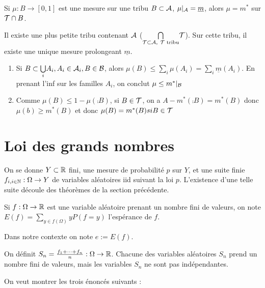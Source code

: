 \documentclass[10pt,a4paper,notitlepage ]{report}
\begin{document}
\begin{theorem}
	Si $\mu : B \rightarrow [0,1]$ est une mesure sur une tribu $B \subset \mathcal A$, $\mu|_\mathcal A = \underline m$, alors $\mu=m^*$ sur $\mathcal T \cap B$.
\end{theorem}

\begin{rem}
	Il existe une plus petite tribu contenant $\mathcal A$ ($\underset{\mathcal T \subset \mathcal A,\ \mathcal T \text{ tribu}}{\bigcap} \mathcal T$). Sur cette tribu, il existe une unique mesure prolongeant $\underline m$.
\end{rem}

\begin{demo}
	\begin{enumerate}
		\item Si $B \subset \underset i \bigcup A_i, A_i \in \mathcal A_i, B \in \mathcal B$, alors $\mu(B) \le \underset i \sum \mu(A_i) = \underset i \sum \underline m(A_i)$. En prenant l'inf sur les familles $A_i$, on conclut $\mu \le m^*|_\mathcal B$
		\item Comme $\mu(B) \le 1- \mu(\comp B)$, si $B \in \mathcal T$, on a $A-m^*(\comp B) = m^*(B)$ donc $\mu(b) \ge m^*(B)$ et donc $\mu(B) = m^*(B) si B\in \mathcal T$
	
	\end{enumerate}
\end{demo}

\section{Loi des grands nombres}

On se donne $Y \subset \mathbb R$ fini, une mesure de probabilité $p$ sur $Y$, et une suite finie $f_{i,i\in\mathbb N} : \Omega \rightarrow Y$ de variables aléatoires iid suivant la loi $p$. L'existence d'une telle suite découle des théorèmes de la section précédente.

\begin{definition}
	Si $f : \Omega \rightarrow \mathbb R$ est une variable aléatoire prenant un nombre fini de valeurs, on note $E(f) = \underset{y \in f(\Omega)} \sum yP(f=y)$ l'espérance de $f$.
\end{definition}

Dans notre contexte on note $e := E(f)$.

On définit $S_n = \frac{f_1 + \dots + f_n} n : \Omega \rightarrow \mathbb R$. Chacune des variables aléatoires $S_n$ prend un nombre fini de valeurs, mais les variables $S_n$ ne sont pas indépendantes.

On veut montrer les trois énoncés suivants :
\end{document}

